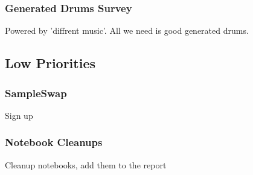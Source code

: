 \documentclass{article}
\begin{document}
\subsubsection{Generated Drums Survey}
Powered by 'diffrent music'. All we need is good generated drums.
\subsection{Low Priorities}
\subsubsection{SampleSwap}
Sign up
\subsubsection{Notebook Cleanups}
Cleanup notebooks, add them to the report


\end{document}
